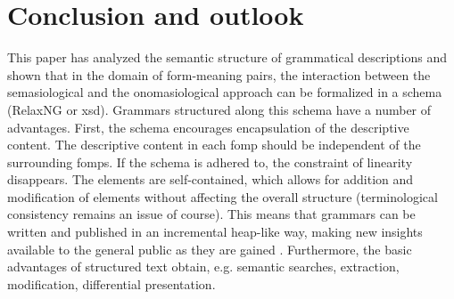 \documentclass[a4paper,12pt]{article}
\begin{document}
\section{Conclusion and outlook}
This paper has analyzed the semantic structure of grammatical descriptions and shown that in the domain of form-meaning pairs,  the interaction between the  semasiological and the onomasiological approach  can be formalized in a schema (RelaxNG or xsd). Grammars structured along this schema have a number of advantages. First, the schema encourages encapsulation of the descriptive content. The descriptive content in each fomp should be independent of the surrounding fomps. If the schema is adhered to, the constraint of linearity disappears. The elements are self-contained, which allows for addition and modification of elements without affecting the overall structure (terminological consistency remains an issue of course). This means that grammars can be written and published in an incremental heap-like way, making new insights available to the general public as they are gained \citep[cf.][]{Weber2006grow}. Furthermore, the basic advantages of structured text obtain, e.g. semantic searches, extraction, modification, differential presentation.
\end{document}

